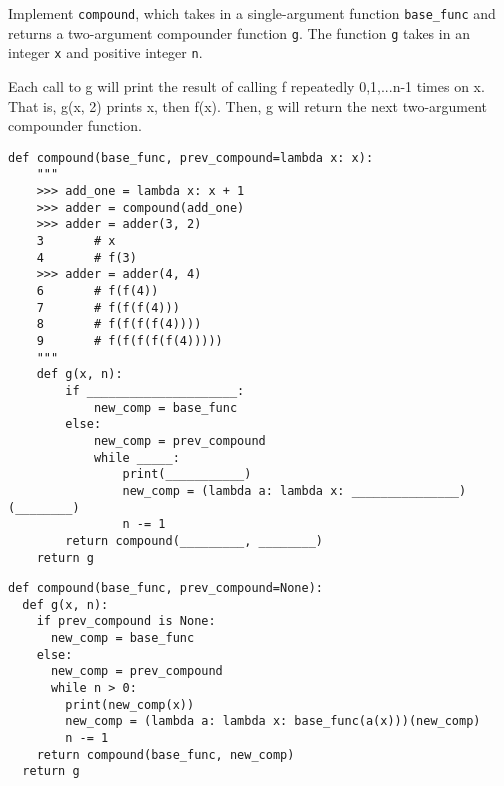 \begin{blocksection}
\question Implement \lstinline$compound$, which takes in a single-argument function \lstinline$base_func$ and returns a two-argument compounder function \lstinline$g$. The function \lstinline$g$ takes in an integer \lstinline$x$ and positive integer \lstinline$n$.

Each call to g will print the result of calling f repeatedly 0,1,...n-1 times on x. That is, g(x, 2) prints x, then f(x). Then, g will return the next two-argument compounder function.

\begin{lstlisting}
def compound(base_func, prev_compound=lambda x: x):
	"""
	>>> add_one = lambda x: x + 1
	>>> adder = compound(add_one)
	>>> adder = adder(3, 2)
	3       # x
	4       # f(3)
	>>> adder = adder(4, 4)
	6       # f(f(4))
	7       # f(f(f(4)))
	8       # f(f(f(f(4))))
	9       # f(f(f(f(f(4)))))
	"""
	def g(x, n):
	    if _____________________:
			new_comp = base_func
		else:
			new_comp = prev_compound
			while _____:
	       		print(___________)
	        	new_comp = (lambda a: lambda x: _______________)(________)
	        	n -= 1
		return compound(_________, ________)
	return g
\end{lstlisting}

\begin{solution}[1in]
\begin{lstlisting}
def compound(base_func, prev_compound=None):
  def g(x, n):
    if prev_compound is None:
      new_comp = base_func
    else:
      new_comp = prev_compound
      while n > 0:
        print(new_comp(x))
        new_comp = (lambda a: lambda x: base_func(a(x)))(new_comp)
        n -= 1
    return compound(base_func, new_comp)
  return g

\end{lstlisting}
\end{solution}
\end{blocksection}